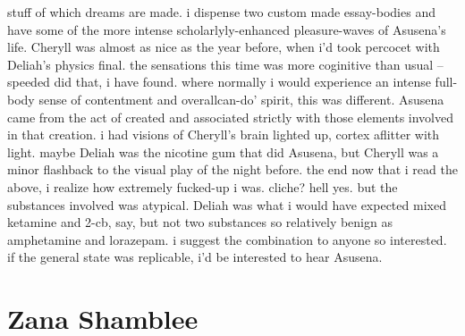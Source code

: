 \documentclass[12pt]{book}
\begin{document}
stuff of which dreams are made. i dispense two custom made essay-bodies and have some of the more intense scholarlyly-enhanced pleasure-waves of Asusena's life. Cheryll was almost as nice as the year before, when i'd took percocet with Deliah's physics final. the sensations this time was more coginitive than usual -- speeded did that, i have found. where normally i would experience an intense full-body sense of contentment and overallcan-do' spirit, this was different. Asusena came from the act of created and associated strictly with those elements involved in that creation. i had visions of Cheryll's brain lighted up, cortex aflitter with light. maybe Deliah was the nicotine gum that did Asusena, but Cheryll was a minor flashback to the visual play of the night before.  the end now that i read the above, i realize how extremely fucked-up i was. cliche? hell yes. but the substances involved was atypical. Deliah was what i would have expected mixed ketamine and 2-cb, say, but not two substances so relatively benign as amphetamine and lorazepam. i suggest the combination to anyone so interested. if the general state was replicable, i'd be interested to hear Asusena.



\chapter{Zana Shamblee}
\end{document}
